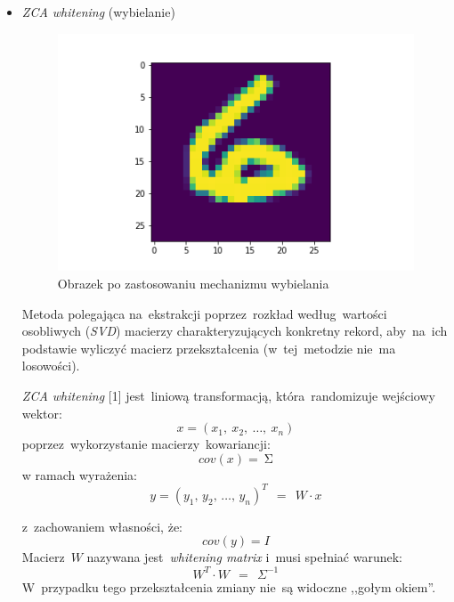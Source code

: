 \documentclass[11pt, a4paper]{article}
\begin{document}
\begin{enumerate}
\begin{itemize}
 \item \textit{ZCA whitening} (wybielanie) \\
 \begin{figure}[H]
  \centering
  \includegraphics[scale=0.6]{zca.png}
  \caption{Obrazek po zastosowaniu mechanizmu wybielania}
 \end{figure}

 Metoda polegająca na~ekstrakcji poprzez~rozkład według~wartości osobliwych (\textit{SVD}) macierzy charakteryzujących konkretny rekord, aby~na~ich podstawie wyliczyć macierz przekształcenia
 (w~tej~metodzie nie~ma losowości).
 
\textit{ZCA whitening} [1] jest~liniową transformacją, która~randomizuje wejściowy wektor:
\begin{equation}
 x=\left(x_1,\ x_2,\ \ldots,\ x_n\right)
\end{equation}
poprzez~wykorzystanie macierzy~kowariancji:
\begin{equation}
 cov\left(x\right)=\ \mathrm{\Sigma}
\end{equation}
w ramach wyrażenia: \\
\begin{equation}
 y = (y_1,\, y_2, \, \ldots,\, y_n)^T \: \: = \: \: W \cdot x
\end{equation}

z~zachowaniem własności, że:
\begin{equation}
 cov\left(y\right)=I
\end{equation}
Macierz~$W$ nazywana jest~\textit{whitening matrix} i~musi spełniać warunek:
\begin{equation}
 W^T \cdot W \: \: = \: \: \Sigma^{-1}
\end{equation}
W~przypadku tego przekształcenia zmiany nie~są widoczne ,,gołym okiem''.
\end{itemize}
\end{enumerate}
\end{document}
